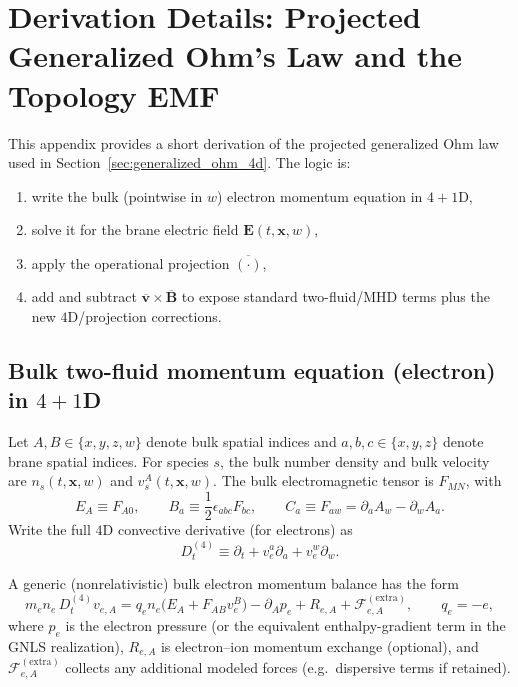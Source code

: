 \documentclass[11pt]{article}
\begin{document}
\section{Derivation Details: Projected Generalized Ohm's Law and the Topology EMF}
\label{app:ohm_projection}

This appendix provides a short derivation of the projected generalized Ohm law used in
Section~\ref{sec:generalized_ohm_4d}. The logic is:

\begin{enumerate}[leftmargin=1.6em]
\item write the bulk (pointwise in \(w\)) electron momentum equation in \(4+1\)D,
\item solve it for the brane electric field \(\mathbf{E}(t,\mathbf{x},w)\),
\item apply the operational projection \(\overline{(\cdot)}\),
\item add and subtract \(\overline{\mathbf{v}}\times\overline{\mathbf{B}}\) to expose standard
two-fluid/MHD terms plus the new \(4\)D/projection corrections.
\end{enumerate}

\subsection{Bulk two-fluid momentum equation (electron) in \texorpdfstring{\(4+1\)}{4+1}D}
\label{app:ohm_bulk}

Let \(A,B\in\{x,y,z,w\}\) denote bulk spatial indices and \(a,b,c\in\{x,y,z\}\) denote
brane spatial indices. For species \(s\), the bulk number density and bulk velocity are
\(n_s(t,\mathbf{x},w)\) and \(v_s^A(t,\mathbf{x},w)\). The bulk electromagnetic tensor is
\(F_{MN}\), with
\begin{equation}
E_A \equiv F_{A0},\qquad
B_a \equiv \frac12\epsilon_{abc}F_{bc},\qquad
C_a \equiv F_{aw}=\partial_a A_w-\partial_w A_a.
\label{eq:app_EBC_defs}
\end{equation}
Write the full \(4\)D convective derivative (for electrons) as
\begin{equation}
D_t^{(4)} \equiv \partial_t + v_e^a\partial_a + v_e^w\partial_w.
\label{eq:app_Dt4}
\end{equation}

A generic (nonrelativistic) bulk electron momentum balance has the form
\begin{equation}
m_e n_e\,D_t^{(4)} v_{e,A}
=
q_e n_e\Big(E_A + F_{AB}v_e^B\Big)
-\partial_A p_e
+R_{e,A}
+\mathcal{F}^{(\mathrm{extra})}_{e,A},
\qquad q_e=-e,
\label{eq:app_euler_e_bulk}
\end{equation}
where \(p_e\) is the electron pressure (or the equivalent enthalpy-gradient term in the GNLS
realization), \(R_{e,A}\) is electron--ion momentum exchange (optional), and
\(\mathcal{F}^{(\mathrm{extra})}_{e,A}\) collects any additional modeled forces (e.g.\ dispersive
terms if retained).
\end{document}
